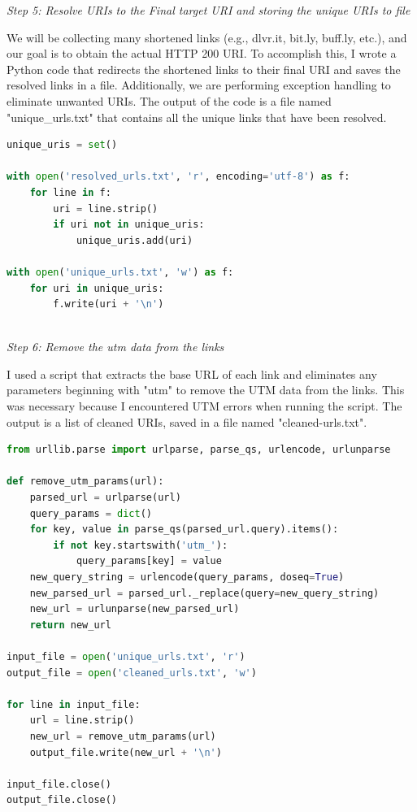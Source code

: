 \documentclass[12pt]{article}
\begin{document}
\emph{Step 5: Resolve URIs to the Final target URI and storing the unique URIs to file}

We will be collecting many shortened links (e.g., dlvr.it, bit.ly, buff.ly, etc.), and our goal is to obtain the actual HTTP 200 URI. To accomplish this, I wrote a Python code that redirects the shortened links to their final URI and saves the resolved links in a file. Additionally, we are performing exception handling to eliminate unwanted URIs. The output of the code is a file named "unique_urls.txt" that contains all the unique links that have been resolved.

\begin{lstlisting}[language=Python, caption=Resolve URIs to the unique target URI, label=lst:copy]
unique_uris = set()

with open('resolved_urls.txt', 'r', encoding='utf-8') as f:
    for line in f:
        uri = line.strip()
        if uri not in unique_uris:
            unique_uris.add(uri)

with open('unique_urls.txt', 'w') as f:
    for uri in unique_uris:
        f.write(uri + '\n')
        
\end{lstlisting}

\emph{Step 6: Remove the utm data from the links }

I used a script that extracts the base URL of each link and eliminates any parameters beginning with "utm" to remove the UTM data from the links. This was necessary because I encountered UTM errors when running the script. The output is a list of cleaned URIs, saved in a file named "cleaned-urls.txt".

\begin{lstlisting}[language=Python, caption=Remove utm to resolve URIs to the final target URI, label=lst:copy]
from urllib.parse import urlparse, parse_qs, urlencode, urlunparse

def remove_utm_params(url):
    parsed_url = urlparse(url)
    query_params = dict()
    for key, value in parse_qs(parsed_url.query).items():
        if not key.startswith('utm_'):
            query_params[key] = value
    new_query_string = urlencode(query_params, doseq=True)
    new_parsed_url = parsed_url._replace(query=new_query_string)
    new_url = urlunparse(new_parsed_url)
    return new_url

input_file = open('unique_urls.txt', 'r')
output_file = open('cleaned_urls.txt', 'w')

for line in input_file:
    url = line.strip()
    new_url = remove_utm_params(url)
    output_file.write(new_url + '\n')

input_file.close()
output_file.close()

        
\end{lstlisting}
\end{document}

